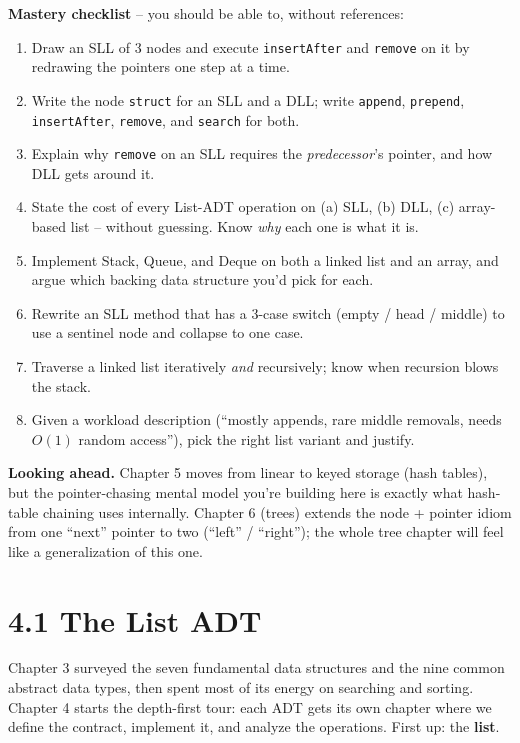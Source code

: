 \documentclass[11pt]{article}
\begin{document}
\begin{ideabox}
\textbf{Mastery checklist} -- you should be able to, without references:
\begin{enumerate}
    \item Draw an SLL of 3 nodes and execute \texttt{insertAfter} and
          \texttt{remove} on it by redrawing the pointers one step at a
          time.
    \item Write the node \texttt{struct} for an SLL and a DLL; write
          \texttt{append}, \texttt{prepend}, \texttt{insertAfter},
          \texttt{remove}, and \texttt{search} for both.
    \item Explain why \texttt{remove} on an SLL requires the
          \emph{predecessor}'s pointer, and how DLL gets around it.
    \item State the cost of every List-ADT operation on (a) SLL,
          (b) DLL, (c) array-based list -- without guessing. Know
          \emph{why} each one is what it is.
    \item Implement Stack, Queue, and Deque on both a linked list and
          an array, and argue which backing data structure you'd pick
          for each.
    \item Rewrite an SLL method that has a 3-case switch (empty / head /
          middle) to use a sentinel node and collapse to one case.
    \item Traverse a linked list iteratively \emph{and} recursively;
          know when recursion blows the stack.
    \item Given a workload description (``mostly appends, rare middle
          removals, needs $O(1)$ random access''), pick the right list
          variant and justify.
\end{enumerate}

\textbf{Looking ahead.} Chapter 5 moves from linear to keyed storage
(hash tables), but the pointer-chasing mental model you're building here
is exactly what hash-table chaining uses internally. Chapter 6 (trees)
extends the node + pointer idiom from one ``next'' pointer to two
(``left'' / ``right''); the whole tree chapter will feel like a
generalization of this one.
\end{ideabox}

\section{4.1 The List ADT}

Chapter 3 surveyed the seven fundamental data structures and the
nine common abstract data types, then spent most of its energy on
searching and sorting. Chapter 4 starts the depth-first tour: each
ADT gets its own chapter where we define the contract, implement it,
and analyze the operations. First up: the \textbf{list}.
\end{document}
